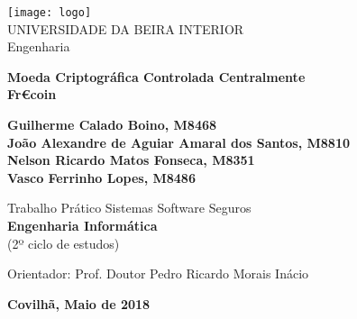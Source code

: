 \begin{titlepage}
\begin{center}

\begin{flushleft}
 \texttt{[image: logo]}\\
\rostoubi UNIVERSIDADE DA BEIRA INTERIOR\\
\rostofac Engenharia\\
\end{flushleft}

\vspace{5.6cm}

\rostotitulo \textbf{ Moeda Criptográfica Controlada Centralmente} \\
\rostosubtit \textbf{Fr€coin}\\

\vspace{1.8cm}

\rostonomes \textbf{Guilherme Calado Boino, M8468\\
João Alexandre de Aguiar Amaral dos Santos, M8810 \\
Nelson Ricardo Matos Fonseca, M8351\\
Vasco Ferrinho Lopes, M8486}\\

\vspace{1.4cm}

\rostooutros Trabalho Prático Sistemas Software Seguros\\
\rostonomes \textbf{Engenharia Informática}\\
\rostooutros (2º ciclo de estudos)\\

\vspace{3.3cm}

\rostooutros Orientador: Prof. Doutor Pedro Ricardo Morais Inácio\\

\vspace{1.4cm}

\rostooutros \textbf{Covilhã, Maio de 2018}

\end{center}
\end{titlepage}

